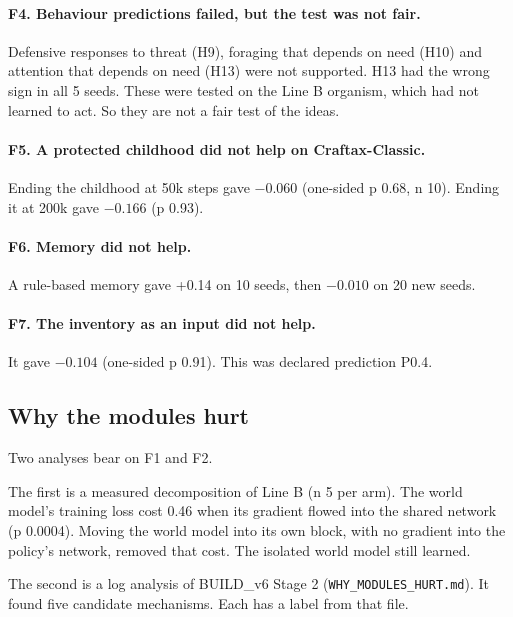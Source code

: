 \documentclass[11pt]{article}
\begin{document}
\paragraph{F4. Behaviour predictions failed, but the test was not fair.}
Defensive responses to threat (H9), foraging that depends on need (H10) and attention that depends on need (H13) were not supported. H13 had the wrong sign in all 5 seeds. These were tested on the Line B organism, which had not learned to act. So they are not a fair test of the ideas.

\paragraph{F5. A protected childhood did not help on Craftax-Classic.}
Ending the childhood at 50k steps gave $-0.060$ (one-sided p 0.68, n 10). Ending it at 200k gave $-0.166$ (p 0.93).

\paragraph{F6. Memory did not help.}
A rule-based memory gave +0.14 on 10 seeds, then $-0.010$ on 20 new seeds.

\paragraph{F7. The inventory as an input did not help.}
It gave $-0.104$ (one-sided p 0.91). This was declared prediction P0.4.

\subsection{Why the modules hurt}

Two analyses bear on F1 and F2.

The first is a measured decomposition of Line B (n 5 per arm). The world model's training loss cost 0.46 when its gradient flowed into the shared network (p 0.0004). Moving the world model into its own block, with no gradient into the policy's network, removed that cost. The isolated world model still learned.

The second is a log analysis of BUILD\_v6 Stage 2 (\texttt{WHY\_MODULES\_HURT.md}). It found five candidate mechanisms. Each has a label from that file.
\end{document}
